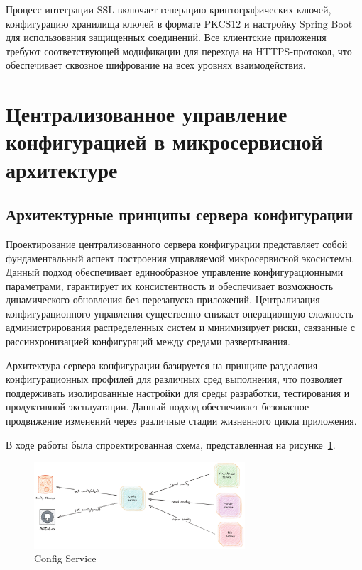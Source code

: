 Процесс интеграции SSL включает генерацию криптографических ключей, конфигурацию хранилища ключей в формате PKCS12 и настройку Spring Boot для использования защищенных соединений. Все клиентские приложения требуют соответствующей модификации для перехода на HTTPS-протокол, что обеспечивает сквозное шифрование на всех уровнях взаимодействия.


\section{Централизованное управление конфигурацией в микросервисной архитектуре}

\subsection{Архитектурные принципы сервера конфигурации}

Проектирование централизованного сервера конфигурации представляет собой фундаментальный аспект построения управляемой микросервисной экосистемы. Данный подход обеспечивает единообразное управление конфигурационными параметрами, гарантирует их консистентность и обеспечивает возможность динамического обновления без перезапуска приложений. Централизация конфигурационного управления существенно снижает операционную сложность администрирования распределенных систем и минимизирует риски, связанные с рассинхронизацией конфигураций между средами развертывания.

Архитектура сервера конфигурации базируется на принципе разделения конфигурационных профилей для различных сред выполнения, что позволяет поддерживать изолированные настройки для среды разработки, тестирования и продуктивной эксплуатации. Данный подход обеспечивает безопасное продвижение изменений через различные стадии жизненного цикла приложения.

В ходе работы была спроектированная схема, представленная на рисунке~\ref{fig:cfg_prj}.

\begin{figure}[htbp]
    \centering
    \includegraphics[width=0.7\textwidth]{Dissertation/images/cfg_project}
    \caption{Config Service}
    \label{fig:cfg_prj}
\end{figure}

